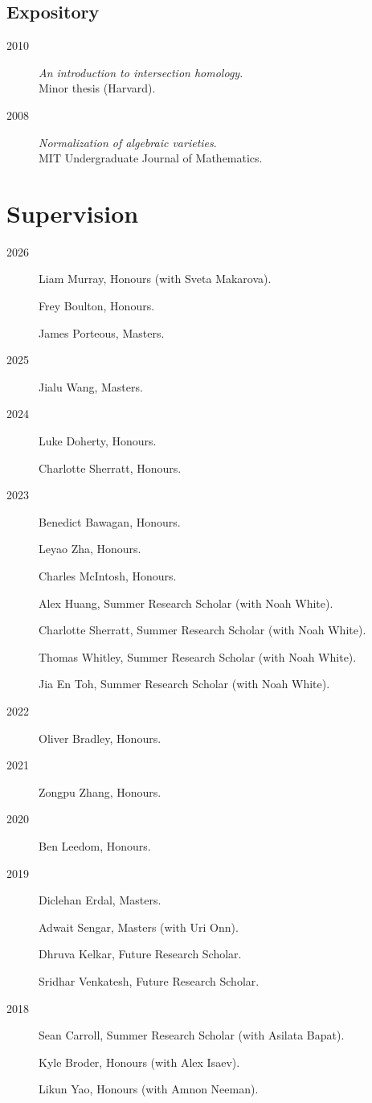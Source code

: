 \documentclass[11pt]{article}
\begin{document}
\subsection*{Expository}
\label{sec:org5b523ea}
\label{orgc13dd54}
\begin{description}
\item[{2010}] \emph{An introduction to intersection homology}.\\
Minor thesis (Harvard).
\item[{2008}] \emph{Normalization of algebraic varieties}.\\
MIT Undergraduate Journal of Mathematics.
\end{description}
\section*{Supervision}
\label{sec:orgbd144a6}

\label{org5fd6fd5}
\begin{description}
\item[{2026}] Liam Murray, Honours (with Sveta Makarova).

Frey Boulton, Honours.

James Porteous, Masters.
\item[{2025}] Jialu Wang, Masters.
\item[{2024}] Luke Doherty, Honours.

Charlotte Sherratt, Honours.
\item[{2023}] Benedict Bawagan, Honours.

Leyao Zha, Honours.

Charles McIntosh, Honours.

Alex Huang, Summer Research Scholar (with Noah White).

Charlotte Sherratt, Summer Research Scholar (with Noah White).

Thomas Whitley, Summer Research Scholar (with Noah White).

Jia En Toh, Summer Research Scholar (with Noah White).
\item[{2022}] Oliver Bradley, Honours.
\item[{2021}] Zongpu Zhang, Honours.
\item[{2020}] Ben Leedom, Honours.
\item[{2019}] Diclehan Erdal, Masters.

Adwait Sengar, Masters (with Uri Onn).

Dhruva Kelkar, Future Research Scholar.

Sridhar Venkatesh, Future Research Scholar.
\item[{2018}] Sean Carroll, Summer Research Scholar (with Asilata Bapat).

Kyle Broder, Honours (with Alex Isaev).

Likun Yao, Honours (with Amnon Neeman).
\end{description}
\end{document}
